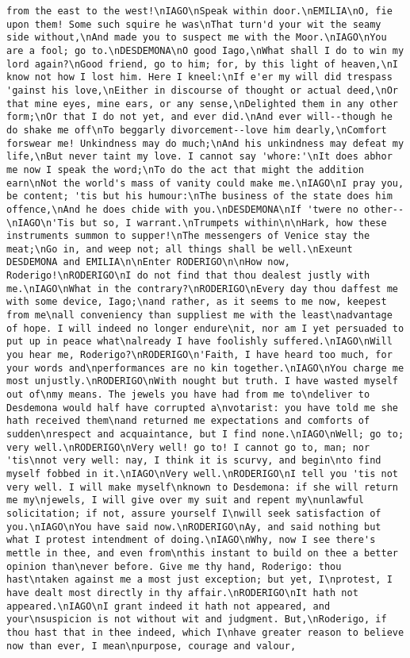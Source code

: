 \begin{verbatim}
from the east to the west!\nIAGO\nSpeak within door.\nEMILIA\nO, fie upon them! Some such squire he was\nThat turn'd your wit the seamy side without,\nAnd made you to suspect me with the Moor.\nIAGO\nYou are a fool; go to.\nDESDEMONA\nO good Iago,\nWhat shall I do to win my lord again?\nGood friend, go to him; for, by this light of heaven,\nI know not how I lost him. Here I kneel:\nIf e'er my will did trespass 'gainst his love,\nEither in discourse of thought or actual deed,\nOr that mine eyes, mine ears, or any sense,\nDelighted them in any other form;\nOr that I do not yet, and ever did.\nAnd ever will--though he do shake me off\nTo beggarly divorcement--love him dearly,\nComfort forswear me! Unkindness may do much;\nAnd his unkindness may defeat my life,\nBut never taint my love. I cannot say 'whore:'\nIt does abhor me now I speak the word;\nTo do the act that might the addition earn\nNot the world's mass of vanity could make me.\nIAGO\nI pray you, be content; 'tis but his humour:\nThe business of the state does him offence,\nAnd he does chide with you.\nDESDEMONA\nIf 'twere no other--\nIAGO\n'Tis but so, I warrant.\nTrumpets within\n\nHark, how these instruments summon to supper!\nThe messengers of Venice stay the meat;\nGo in, and weep not; all things shall be well.\nExeunt DESDEMONA and EMILIA\n\nEnter RODERIGO\n\nHow now, Roderigo!\nRODERIGO\nI do not find that thou dealest justly with me.\nIAGO\nWhat in the contrary?\nRODERIGO\nEvery day thou daffest me with some device, Iago;\nand rather, as it seems to me now, keepest from me\nall conveniency than suppliest me with the least\nadvantage of hope. I will indeed no longer endure\nit, nor am I yet persuaded to put up in peace what\nalready I have foolishly suffered.\nIAGO\nWill you hear me, Roderigo?\nRODERIGO\n'Faith, I have heard too much, for your words and\nperformances are no kin together.\nIAGO\nYou charge me most unjustly.\nRODERIGO\nWith nought but truth. I have wasted myself out of\nmy means. The jewels you have had from me to\ndeliver to Desdemona would half have corrupted a\nvotarist: you have told me she hath received them\nand returned me expectations and comforts of sudden\nrespect and acquaintance, but I find none.\nIAGO\nWell; go to; very well.\nRODERIGO\nVery well! go to! I cannot go to, man; nor 'tis\nnot very well: nay, I think it is scurvy, and begin\nto find myself fobbed in it.\nIAGO\nVery well.\nRODERIGO\nI tell you 'tis not very well. I will make myself\nknown to Desdemona: if she will return me my\njewels, I will give over my suit and repent my\nunlawful solicitation; if not, assure yourself I\nwill seek satisfaction of you.\nIAGO\nYou have said now.\nRODERIGO\nAy, and said nothing but what I protest intendment of doing.\nIAGO\nWhy, now I see there's mettle in thee, and even from\nthis instant to build on thee a better opinion than\never before. Give me thy hand, Roderigo: thou hast\ntaken against me a most just exception; but yet, I\nprotest, I have dealt most directly in thy affair.\nRODERIGO\nIt hath not appeared.\nIAGO\nI grant indeed it hath not appeared, and your\nsuspicion is not without wit and judgment. But,\nRoderigo, if thou hast that in thee indeed, which I\nhave greater reason to believe now than ever, I mean\npurpose, courage and valour, 
\end{verbatim}
